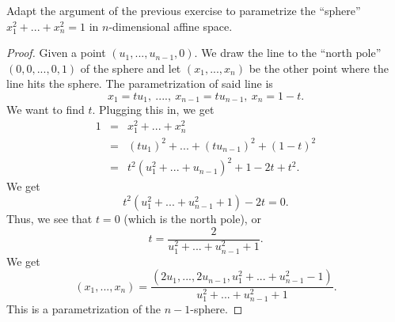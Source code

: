 \begin{exercise}{7}
    Adapt the argument of the previous exercise to parametrize the ``sphere'' $x_1^2 + ... + x_n^2 = 1$ in $n$-dimensional affine space.
\end{exercise}
\begin{proof}
    Given a point $(u_1,...,u_{n-1},0)$. We draw the line to the ``north pole'' $(0,0,...,0,1)$ of the sphere and let $(x_1,...,x_n)$ be the other point where the line hits the sphere. The parametrization of said line is
    $$x_1 = tu_1,~....,~x_{n-1} = tu_{n-1},~x_n = 1 - t.$$
    We want to find $t$. Plugging this in, we get
    \begin{eqnarray*}
        1
        & = & x_1^2 + ... + x_n^2\\
        & = & (tu_1)^2 + ... + (tu_{n-1})^2 + (1-t)^2\\
        & = & t^2 (u_1^2 + ... + u_{n-1})^2 + 1 - 2t + t^2.
    \end{eqnarray*}
    We get
    $$t^2 (u_1^2 + ... + u_{n-1}^2 + 1) - 2t = 0.$$
    Thus, we see that $t=0$ (which is the north pole), or
    $$t = \frac{2}{u_1^2 + ... + u_{n-1}^2 + 1}.$$
    We get
    $$(x_1,...,x_n) = \frac{(2u_1, ..., 2 u_{n-1}, u_1^2 + ... + u_{n-1}^2 -1)}{u_1^2 + ... + u_{n-1}^2 + 1}.$$
    This is a parametrization of the $n-1$-sphere.
\end{proof}

